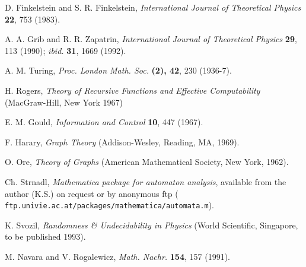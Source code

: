 \documentclass{article}
\begin{document}
\begin{thebibliography}{999}
 D. Finkelstein and S. R. Finkelstein,
 {\sl International Journal of Theoretical Physics} {\bf 22}, 753
 (1983).

A. A. Grib and
R. R. Zapatrin,
{\sl International Journal of Theoretical Physics} {\bf 29}, 113 (1990);
{\it ibid.} {\bf 31}, 1669 (1992).

 A. M. Turing, {\sl Proc. London Math. Soc.} {\bf (2), 42}, 230
 (1936-7).

H. Rogers, {\sl Theory of Recursive Functions and Effective
Computability} (MacGraw-Hill, New York 1967)

 E. M. Gould, {\sl Information and Control} {\bf 10}, 447 (1967).

 F. Harary, {\sl Graph Theory} (Addison-Wesley, Reading, MA, 1969).

 O. Ore, {\sl Theory of Graphs} (American Mathematical Society,
 New York, 1962).

Ch. Strnadl, {\sl Mathematica package for automaton analysis}, available
from the author (K.S.) on request or by anonymous ftp ({\tt
ftp.univie.ac.at/packages/mathematica/automata.m}).

K. Svozil, {\sl Randomness \& Undecidability in Physics}
(World Scientific, Singapore, to be published 1993).

M. Navara and V. Rogalewicz, {\sl Math. Nachr.} {\bf 154}, 157 (1991).

\end{thebibliography}
\end{document}
